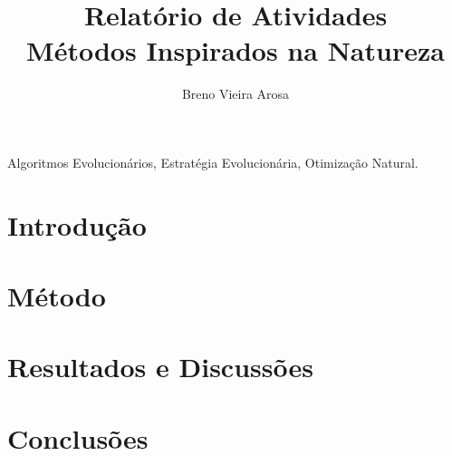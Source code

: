 \documentclass[a4paper,journal]{IEEEtran}
\begin{document}
%
\title{Relatório de Atividades \\ Métodos Inspirados na Natureza}



\author{Breno Vieira Arosa}

\maketitle

\begin{abstract}

\end{abstract}

\begin{IEEEkeywords}
Algoritmos Evolucionários, Estratégia Evolucionária, Otimização Natural.
\end{IEEEkeywords}

\section{Introdução} \label{sec:introduction}


\section{Método} \label{sec:methodology}


\section{Resultados e Discussões} \label{sec:results}


\section{Conclusões} \label{sec:conclusion}



\end{document}
